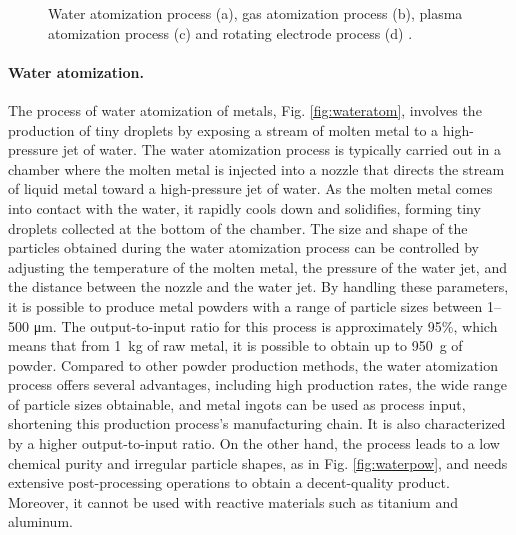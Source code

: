 \begin{figure}
{    }
    \qquad
    \caption[Atomization processes.]{Water atomization process (a), gas atomization process (b), plasma atomization process (c) and rotating electrode process (d) \cite{material_technology_innovations_co_rotating_2020, material_technology_innovations_co_water_2020, material_technology_innovations_co_gas_2020, inovar_communications_ltd_metal_2020}.}
    \label{fig:atom}
\end{figure}
\paragraph{Water atomization.}The process of water atomization of metals, Fig. \ref{fig:wateratom}, involves the production of tiny droplets by exposing a stream of molten metal to a high-pressure jet of water. The water atomization process is typically carried out in a chamber where the molten metal is injected into a nozzle that directs the stream of liquid metal toward a high-pressure jet of water. As the molten metal comes into contact with the water, it rapidly cools down and solidifies, forming tiny droplets collected at the bottom of the chamber. The size and shape of the particles obtained during the water atomization process can be controlled by adjusting the temperature of the molten metal, the pressure of the water jet, and the distance between the nozzle and the water jet. By handling these parameters, it is possible to produce metal powders with a range of particle sizes between \numrange[range-phrase = --]{1}{500} \unit{\micro\metre}. The output-to-input ratio for this process is approximately 95\%, which means that from \SI{1}{\kilo\gram} of raw metal, it is possible to obtain up to \SI{950}{\gram} of powder. Compared to other powder production methods, the water atomization process offers several advantages, including high production rates, the wide range of particle sizes obtainable, and metal ingots can be used as process input, shortening this production process's manufacturing chain. It is also characterized by a higher output-to-input ratio. On the other hand, the process leads to a low chemical purity and irregular particle shapes, as in Fig. \ref{fig:waterpow}, and needs extensive post-processing operations to obtain a decent-quality product. Moreover, it cannot be used with reactive materials such as titanium and aluminum.
